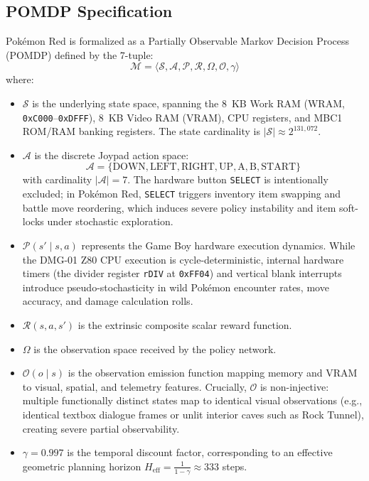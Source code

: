 \documentclass[conference]{IEEEtran}
\begin{document}
\subsection{POMDP Specification}
Pok{\'e}mon Red is formalized as a Partially Observable Markov Decision Process (POMDP) defined by the 7-tuple:
\begin{equation}
\mathcal{M} = \langle \mathcal{S}, \mathcal{A}, \mathcal{P}, \mathcal{R}, \Omega, \mathcal{O}, \gamma \rangle
\end{equation}
where:
\begin{itemize}
    \item $\mathcal{S}$ is the underlying state space, spanning the 8~KB Work RAM (WRAM, \texttt{0xC000}--\texttt{0xDFFF}), 8~KB Video RAM (VRAM), CPU registers, and MBC1 ROM/RAM banking registers. The state cardinality is $|\mathcal{S}| \approx 2^{131{,}072}$.
    \item $\mathcal{A}$ is the discrete Joypad action space:
    \begin{equation}
    \mathcal{A} = \{ \text{DOWN}, \text{LEFT}, \text{RIGHT}, \text{UP}, \text{A}, \text{B}, \text{START} \}
    \end{equation}
    with cardinality $|\mathcal{A}| = 7$. The hardware button \texttt{SELECT} is intentionally excluded; in Pok{\'e}mon Red, \texttt{SELECT} triggers inventory item swapping and battle move reordering, which induces severe policy instability and item soft-locks under stochastic exploration.
    \item $\mathcal{P}(s' \mid s, a)$ represents the Game Boy hardware execution dynamics. While the DMG-01 Z80 CPU execution is cycle-deterministic, internal hardware timers (the divider register \texttt{rDIV} at \texttt{0xFF04}) and vertical blank interrupts introduce pseudo-stochasticity in wild Pok{\'e}mon encounter rates, move accuracy, and damage calculation rolls.
    \item $\mathcal{R}(s, a, s')$ is the extrinsic composite scalar reward function.
    \item $\Omega$ is the observation space received by the policy network.
    \item $\mathcal{O}(o \mid s)$ is the observation emission function mapping memory and VRAM to visual, spatial, and telemetry features. Crucially, $\mathcal{O}$ is non-injective: multiple functionally distinct states map to identical visual observations (e.g., identical textbox dialogue frames or unlit interior caves such as Rock Tunnel), creating severe partial observability.
    \item $\gamma = 0.997$ is the temporal discount factor, corresponding to an effective geometric planning horizon $H_{\text{eff}} = \frac{1}{1-\gamma} \approx 333$ steps.
\end{itemize}
\end{document}
